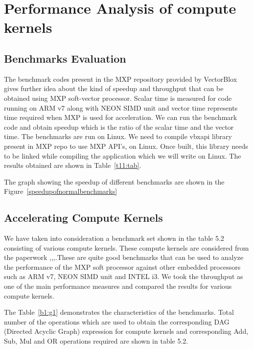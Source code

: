 \newpage
\chapter{Performance Analysis of compute kernels}

\section{Benchmarks Evaluation}

The benchmark codes present in the MXP repository provided by VectorBlox gives further idea about the kind of speedup and throughput that can be obtained using MXP soft-vector processor. Scalar time is measured for code running on ARM v7 along with NEON SIMD unit and vector time represents time required when MXP is used for acceleration. We can run the benchmark code and obtain speedup which is the ratio of the scalar time and the vector time. The benchmarks are run on Linux. We need to compile vbxapi library present in MXP repo to use MXP API’s, on Linux.  Once built, this library needs to be linked while compiling the application which we will write on Linux. The results obtained are shown in Table~\ref{t11:tab}.





The graph showing the speedup of different benchmarks are shown in the Figure~\ref{speedupofnormalbenchmarks}




\section{Accelerating Compute Kernels}
We have taken into consideration a benchmark set shown in the table 5.2 consisting of various compute kernels. These compute kernels are considered from the paperwork \cite{20},\cite{21},\cite{22},\cite{23}.These are quite good benchmarks that can be used to analyze the performance of the MXP soft processor against other embedded processors such as ARM v7, NEON SIMD unit and INTEL i3. We took the throughput as one of the main performance measures and compared the results for various compute kernels.




The Table~\ref{b1:g1} demonstrates the characteristics of the benchmarks. Total number of the operations which are used to obtain the corresponding DAG (Directed Acyclic Graph) expression for compute kernels and corresponding Add, Sub, Mul and OR operations required are shown in table 5.2. 


